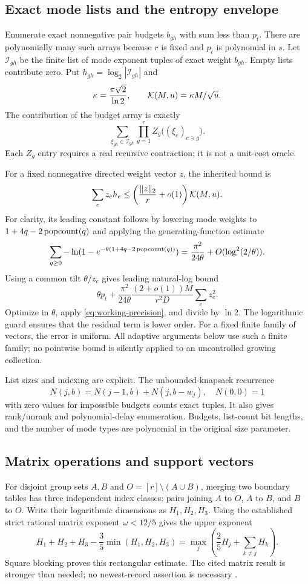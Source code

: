 \subsection{Exact mode lists and the entropy envelope}
Enumerate exact nonnegative pair budgets $b_{gh}$ with sum less than $p_t$.
There are polynomially many such arrays because $r$ is fixed and $p_t$ is
polynomial in $s$. Let $\mathcal I_{gh}$ be the finite list of mode
exponent tuples of exact weight $b_{gh}$. Empty lists contribute zero.
Put $h_{gh}=\log_2|\mathcal I_{gh}|$ and
\[
 \kappa=\frac{\pi\sqrt2}{\ln2},\qquad
 \mathcal K(M,u)=\kappa M/\sqrt u.
\]
The contribution of the budget array is exactly
\begin{equation}\label{eq:finite-sum}
 \sum_{\xi_{gh}\in\mathcal I_{gh}}
 \prod_{g=1}^r Z_g\bigl((\xi_e)_{e\ni g}\bigr).
\end{equation}
Each $Z_g$ entry requires a real recursive contraction; it is not a
unit-cost oracle.

For a fixed nonnegative directed weight vector $z$, the inherited bound is
\begin{equation}\label{eq:entropy}
 \sum_e z_eh_e\le
 \left(\frac{\|z\|_2}{r}+o(1)\right)\mathcal K(M,u).
\end{equation}
For clarity, its leading constant follows by lowering mode weights to
$1+4q-2\operatorname{popcount}(q)$ and applying the generating-function estimate
\[
 \sum_{q\ge0}-\ln(1-e^{-\theta(1+4q-2\operatorname{popcount}(q))})
 =\frac{\pi^2}{24\theta}+O(\log^2(2/\theta)).
\]
Using a common tilt $\theta/z_e$ gives leading natural-log bound
\[
 \theta p_t+\frac{\pi^2}{24\theta}
 \frac{(2+o(1))M}{r^2D}\sum_ez_e^2.
\]
Optimize in $\theta$, apply \eqref{eq:working-precision}, and divide by
$\ln2$. The logarithmic guard ensures that the residual term is lower order.
For a fixed finite family of vectors, the error is uniform. All adaptive
arguments below use such a finite family; no pointwise bound is silently
applied to an uncontrolled growing collection.

List sizes and indexing are explicit. The unbounded-knapsack recurrence
\[
 N(j,b)=N(j-1,b)+N(j,b-w_j),\quad N(0,0)=1
\]
with zero values for impossible budgets counts exact tuples. It also gives
rank/unrank and polynomial-delay enumeration. Budgets, list-count bit lengths,
and the number of mode types are polynomial in the original size parameter.

\subsection{Matrix operations and support vectors}
For disjoint group sets $A,B$ and $O=[r]\setminus(A\cup B)$, merging two
boundary tables has three independent index classes: pairs joining $A$ to
$O$, $A$ to $B$, and $B$ to $O$. Write their logarithmic dimensions as
$H_1,H_2,H_3$. Using the established strict rational matrix exponent
$\omega<12/5$ gives the upper exponent
\begin{equation}\label{eq:matrix-cost}
 H_1+H_2+H_3-\frac35\min(H_1,H_2,H_3)
 =\max_j\left(\frac25 H_j+\sum_{k\ne j}H_k\right).
\end{equation}
Square blocking proves this rectangular estimate. The cited matrix result
is stronger than needed; no newest-record assertion is necessary
\cite{matrix}.

